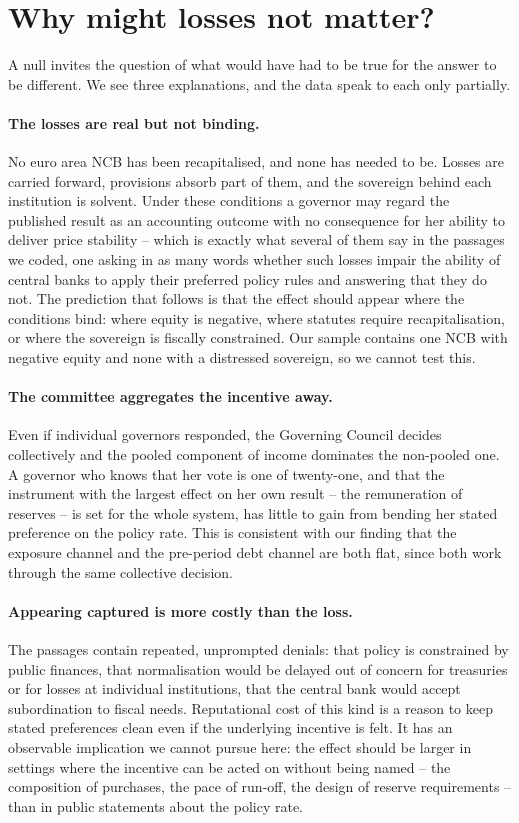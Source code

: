 \documentclass[11pt]{article}
\theoremstyle{plain}
\begin{document}
\section{Why might losses not matter?}\label{sec:discussion}

A null invites the question of what would have had to be true for the answer to be different. We see three explanations, and the data speak to each only partially.

\paragraph{The losses are real but not binding.}
No euro area NCB has been recapitalised, and none has needed to be. Losses are carried forward, provisions absorb part of them, and the sovereign behind each institution is solvent. Under these conditions a governor may regard the published result as an accounting outcome with no consequence for her ability to deliver price stability -- which is exactly what several of them say in the passages we coded, one asking in as many words whether such losses impair the ability of central banks to apply their preferred policy rules and answering that they do not. The prediction that follows is that the effect should appear where the conditions bind: where equity is negative, where statutes require recapitalisation, or where the sovereign is fiscally constrained. Our sample contains one NCB with negative equity and none with a distressed sovereign, so we cannot test this.

\paragraph{The committee aggregates the incentive away.}
Even if individual governors responded, the Governing Council decides collectively and the pooled component of income dominates the non-pooled one. A governor who knows that her vote is one of twenty-one, and that the instrument with the largest effect on her own result -- the remuneration of reserves -- is set for the whole system, has little to gain from bending her stated preference on the policy rate. This is consistent with our finding that the exposure channel and the pre-period debt channel are both flat, since both work through the same collective decision.

\paragraph{Appearing captured is more costly than the loss.}
The passages contain repeated, unprompted denials: that policy is constrained by public finances, that normalisation would be delayed out of concern for treasuries or for losses at individual institutions, that the central bank would accept subordination to fiscal needs. Reputational cost of this kind is a reason to keep stated preferences clean even if the underlying incentive is felt. It has an observable implication we cannot pursue here: the effect should be larger in settings where the incentive can be acted on without being named -- the composition of purchases, the pace of run-off, the design of reserve requirements -- than in public statements about the policy rate.
\end{document}

